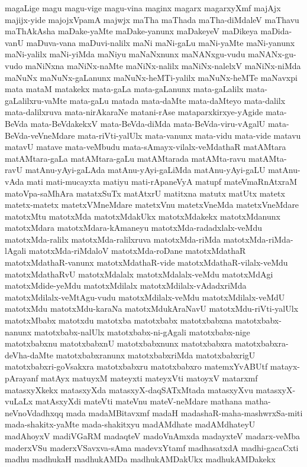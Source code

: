 {magaLige
magu
magu-vige
magu-vina
maginx
magarx
magarxyXmf
majAjx
majijx-yide
majojxVpamA
majwjx
maTha
maThada
maTha-diMdaleV
maThavu
maThAkAsha
maDake-yaMte
maDake-yanunx
maDakeyeV
maDikeya
maDida-vanU
maDuva-vana
maDuvi-nalilx
maNi
maNi-gaLu
maNi-yaMte
maNi-yanunx
maNi-yalilx
maNi-yiMda
maNiyu
maNaNxnunx
maNANxgu-vudu
maNANx-gu-vudo
maNiNxna
maNiNx-naMte
maNiNx-nalilx
maNiNx-nalelxV
maNiNx-niMda
maNuNx
maNuNx-gaLanunx
maNuNx-heMTi-yalilx
maNuNx-heMTe
maNavxpi
mata
mataM
matakekx
mata-gaLa
mata-gaLanunx
mata-gaLalilx
mata-gaLalilxru-vaMte
mata-gaLu
matada
mata-daMte
mata-daMteyo
mata-dalilx
mata-dalilxruva
mata-nirAkaraNe
matani-rAse
mataparxkirxye-yAgide
mata-BeVda
mata-BeVdakekxV
mata-BeVda-diMda
mata-BeVda-viru-vAgalU
mata-BeVda-veVneMdare
mata-riVti-yalUlx
mata-vanunx
mata-vidu
mata-vide
matavu
matavU
matave
mata-veMbudu
mata-sAmayx-vilalx-veMdathaR
matAMtara
matAMtara-gaLa
matAMtara-gaLu
matAMtarada
matAMta-ravu
matAMta-ravU
matAnu-yAyi-gaLAda
matAnu-yAyi-gaLiMda
matAnu-yAyi-gaLU
matAnu-vAda
mati
mati-mucayxta
matiyu
mati-rApaneVyA
matupf
mateVmaRnAtxraM
matoVpa-saMhAra
matatxSuTx
matAtxrU
matitxna
matutx
matUtx
matetx
matetx-matetx
matetxVMneMdare
matetxVnu
matetxVneMda
matetxVneMdare
matotxMtu
matotxMda
matotxMdakUkx
matotxMdakekx
matotxMdanunx
matotxMdara
matotxMdara-kAmaneyu
matotxMda-radadxlalx-veMdu
matotxMda-ralilx
matotxMda-ralilxruva
matotxMda-riMda
matotxMda-riMda-lAgali
matotxMda-riMdaloV
matotxMda-roDane
matotxMdathaR
matotxMdathaR-vanunx
matotxMdathaR-vide
matotxMdathaR-vilalx-veMdu
matotxMdathaRvU
matotxMdalalx
matotxMdalalx-veMdu
matotxMdAgi
matotxMdide-yeMdu
matotxMdilalx
matotxMdilalx-vAdadxriMda
matotxMdilalx-veMtAgu-vudu
matotxMdilalx-veMdu
matotxMdilalx-veMdU
matotxMdu
matotxMdu-karaNa
matotxMdukAraNavU
matotxMdu-riVti-yalUlx
matotxMbabx
matotxdu
matotxba
matotxbabx
matotxbabxna
matotxbabx-nanunx
matotxbabx-nalUlx
matotxbabx-ni-gAgali
matotxbabx-nige
matotxbabxnu
matotxbabxnU
matotxbabxnunx
matotxbabxra
matotxbabxra-deVha-daMte
matotxbabxranunx
matotxbabxriMda
matotxbabxrigU
matotxbabxri-goVsakxra
matotxbabxru
matotxbabxro
matemxYvABUtf
matayx-pArayanf
matAyx
matuyxM
mateyxti
mateyxVti
matoyxV
matarxmf
matasxyXkekx
matasxyXda
matasxyX-daqSATxMtada
matasxyXvu
matasxyX-vuLaLx
matAsxyXdi
mateVti
mateVnu
mateV-neMdare
mathana
matha-neVnoVdadhxqq
mada
madaMBitavxmf
madaH
madashaR-maha-mashwrxSa-miti
mada-shakitx-yaMte
mada-shakitxyu
madAMdhate
madAMdhateyU
madAhoyxV
madiVGaRM
madaqteV
madoVnAmxda
madayxteV
madarx-veMba
maderxVSu
maderxVSavxva-sAma
madevxYtamf
madhasatxdA
madhi-gacaCxti
madhu
madhukaH
madhukAMDa
madhukAMDakUkx
madhukAMDakekx
}
